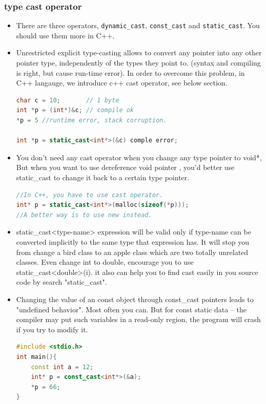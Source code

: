 \documentclass[a4paper,12pt,twoside]{book}
\begin{document}
\subsubsection{type cast operator}
\begin{itemize}
\item There are three operators, \texttt{dynamic\_cast}, \texttt{const\_cast} and \texttt{static\_cast}. You should use them more in C++.

\item Unrestricted explicit type-casting allows to convert any pointer into any other pointer type, independently of the types they point to.  (syntax and compiling is right, but cause run-time error). In order to overcome this problem,  in C++ langauge, we introduce c++ cast operator, see below section.
\begin{lstlisting}[frame=single, language=c++]
char c = 10;       // 1 byte
int *p = (int*)&c; // compile ok
*p = 5 //runtime error, stack corruption.

int *p = static_cast<int*>(&c) comple error;
\end{lstlisting}

\item You don't need any cast operator when you change any type pointer to void*, But when you want to use dereference void pointer , you'd better use static\_cast to change it back to a certain type pointer.
\begin{lstlisting}[frame=single, language=c++]
//In C++, you have to use cast operator.
int* p = static_cast<int*>(malloc(sizeof(*p)));
//A better way is to use new instead.
\end{lstlisting}

\item    static\_cast<type-name> expression will be valid only if type-name can be converted implicitly to the same type that expression has.  It will stop you from change a bird class to an apple class which  are two totally unrelated classes.  Even change int to double, encourage you to use static\_cast<double>(i).  it also can help you to find cast easily in you source code by search "static\_cast".

\item Changing the value of an const object through const\_cast pointers leads to  "undefined behavior". Most often you can. But for const static data -- the compiler may put such variables in a read-only region, the program will crash if you try to modify it.

\begin{lstlisting}[frame=single, language=c++]
#include <stdio.h>
int main(){
    const int a = 12;
    int* p = const_cast<int*>(&a);
    *p = 66;
}
\end{lstlisting}


\end{itemize}
\end{document}

